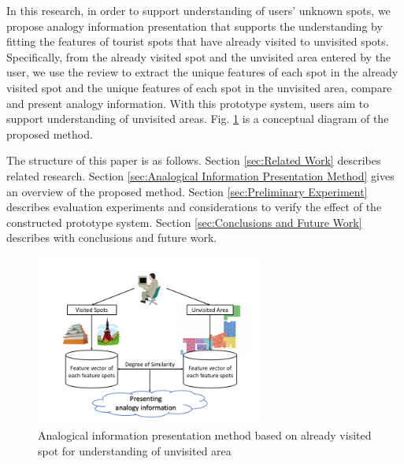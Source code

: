 \documentclass[journal]{IAENGtran}
\begin{document}
In this research, in order to support understanding of users' unknown spots, we propose analogy information presentation that supports the understanding by fitting the features of tourist spots that have already visited to unvisited spots.
Specifically, from the already visited spot and the unvisited area entered by the user, we use the review to extract the unique features of each spot in the already visited spot and the unique features of each spot in the unvisited area, compare and present analogy information.
With this prototype system, users aim to support understanding of unvisited areas.
Fig. \ref{fig:Photo_Image} is a conceptual diagram of the proposed method.

The structure of this paper is as follows.
Section \ref{sec:Related Work} describes related research.
Section \ref{sec:Analogical Information Presentation Method} gives an overview of the proposed method.
Section \ref{sec:Preliminary Experiment} describes evaluation experiments and considerations to verify the effect of the constructed prototype system.
Section \ref{sec:Conclusions and Future Work} describes with conclusions and future work.

\begin{figure}[t]
  \begin{center}
    \includegraphics[clip,width=7.5cm,bb=0 0 720 540]{picture/Photo_Image_eng.png}
    \caption{Analogical information presentation method based on already visited spot for understanding of unvisited area}
    \label{fig:Photo_Image}
   \end{center}
\end{figure}
\end{document}

